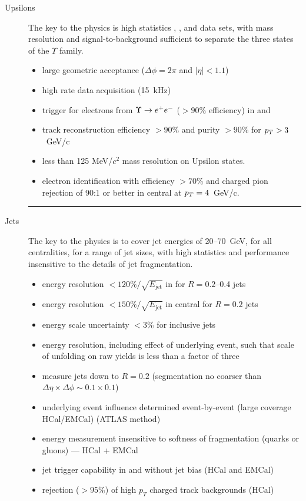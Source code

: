 \begin{description}

\item[Upsilons] The key to the physics is high statistics \pp, \pA,
  and \hic data sets, with mass resolution and signal-to-background
  sufficient to separate the three states of the $\Upsilon$ family.
  \begin{itemize}
  \item large geometric acceptance ($\Delta\phi = 2\pi$ and $|\eta| < 1.1$)
  \item high rate data acquisition (15~kHz)
  \item trigger for electrons from $\Upsilon\rightarrow\mbox{$e^+e^-$}$ ($>90$\% efficiency)
    in \pp and \pA
  \item track reconstruction efficiency $>90$\% and purity $>90$\% for
    $\mbox{${p_T}$} > 3$~GeV/c
  \item less than 125 MeV/$c^2$ mass resolution on Upsilon states.
  \item electron identification with efficiency $>70$\% and charged
    pion rejection of 90:1 or better in central \auau at $\mbox{${p_T}$} =
    4$~GeV/c.
  \end{itemize}

  \hrule

\item[Jets] The key to the physics is to cover jet energies of
  20--70~GeV, for all centralities, for a range of jet sizes, with
  high statistics and performance insensitive to the details of jet
  fragmentation.

  \begin{itemize}
  \item energy resolution $<120\%/\sqrt{E_{\mathrm{jet}}}$ in \pp
    for $R = 0.2$--0.4 jets
  \item energy resolution $<150\%/\sqrt{E_{\mathrm{jet}}}$ in
    central \auau for $R = 0.2$ jets
  \item energy scale uncertainty $<3$\% for inclusive jets
  \item energy resolution, including effect of underlying event, such
    that scale of unfolding on raw yields is less than a factor of
    three
  \item measure jets down to $R=0.2$ (segmentation no coarser than
    $\Delta\eta \times\Delta\phi \sim 0.1 \times 0.1$)
  \item underlying event influence determined event-by-event (large coverage
    HCal/EMCal) (ATLAS method)
  \item energy measurement insensitive to softness of fragmentation (quarks or gluons) --- HCal + EMCal
  \item jet trigger capability in \pp and \pA without jet bias (HCal
    and EMCal)
  \item rejection ($>95$\%) of high $p_T$ charged track backgrounds (HCal)
  \end{itemize}


\end{description}
